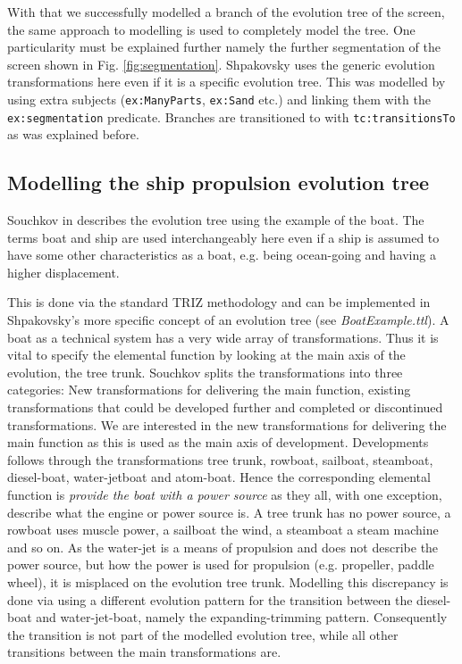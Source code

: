 \documentclass[11pt,a4paper]{article}
\begin{document}
With that we successfully modelled a branch of the evolution tree of the screen, the same approach to modelling is used to completely model the tree. One particularity must be explained further namely the further segmentation of the screen shown in Fig. \ref{fig:segmentation}. Shpakovsky uses the generic evolution transformations here even if it is a specific evolution tree. This was modelled by using extra subjects (\texttt{ex:ManyParts}, \texttt{ex:Sand} etc.) and linking them with the \texttt{ex:segmentation} predicate. Branches are transitioned to with \texttt{tc:transitionsTo} as was explained before. 



\subsection{Modelling the ship propulsion evolution tree}

Souchkov in \cite{KS} describes the evolution tree using the example of the boat. The terms boat and ship are used interchangeably here even if a ship is assumed to have some other characteristics as a boat, e.g. being ocean-going and having a higher displacement.

This is done via the standard TRIZ methodology and can be implemented in Shpakovsky's more specific concept of an evolution tree (see \textit{BoatExample.ttl}). A boat as a technical system has a very wide array of transformations. Thus it is vital to specify the elemental function by looking at the main axis of the evolution, the tree trunk.
Souchkov splits the transformations into three categories: New transformations for delivering the main function, existing transformations that could be developed further and completed or discontinued transformations. We are interested in the new transformations for delivering the main function as this is used as the main axis of development. Developments follows through the transformations tree trunk, rowboat, sailboat, steamboat, diesel-boat, water-jetboat and atom-boat. Hence the corresponding elemental function is \textit{provide the boat with a power source} as they all, with one exception, describe what the engine or power source is. A tree trunk has no power source, a rowboat uses muscle power, a sailboat the wind, a steamboat a steam machine and so on. As the water-jet is a means of propulsion and does not describe the power source, but how the power is used for propulsion (e.g. propeller, paddle wheel), it is misplaced on the evolution tree trunk.
Modelling this discrepancy is done via using a different evolution pattern for the transition between the diesel-boat and water-jet-boat, namely the expanding-trimming pattern. Consequently the transition is not part of the modelled evolution tree, while all other transitions between the main transformations are.
\end{document}
